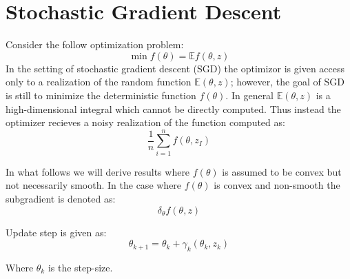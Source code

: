 \section{Stochastic Gradient Descent}
Consider the follow optimization problem:
\begin{equation}
	\min f(\theta) = \mathbb{E}f(\theta, z)
\end{equation}
In the setting of stochastic gradient descent (SGD) the optimizor is given access only to a realization of the random function $\mathbb{E} (\theta, z)$; however, the goal of SGD is still to minimize the deterministic function $f(\theta)$. 
In general $\mathbb{E}(\theta, z)$ is a high-dimensional integral which cannot be directly computed. Thus instead the optimizer recieves a noisy realization of the function computed as:
\begin{equation}
	\frac{1}{n}\sum_{i=1}^{n} f(\theta, z_I)
\end{equation}

In what follows we will derive results where $f(\theta)$ is assumed to be convex but not necessarily smooth. In the case where $f(\theta)$ is convex and non-smooth the subgradient is denoted as: 
\begin{equation}
\delta_{\theta} f (\theta,z)
\end{equation}


Update step is given as: 
\begin{equation}
	\theta_{k+1} = \theta_k + \gamma_k \left(\theta_k, z_k\right)
\end{equation}

Where $\theta_k$ is the step-size. 